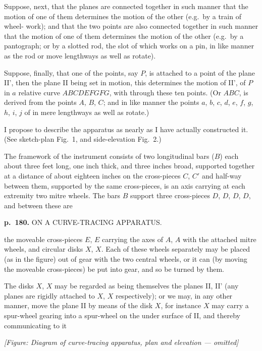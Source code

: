 \documentclass[11pt,a4paper]{book}
\begin{document}
Suppose, next, that the planes are connected together in such manner that the
motion of one of them determines the motion of the other (e.g.\ by a train of wheel-
work); and that the two points are also connected together in such manner that the
motion of one of them determines the motion of the other (e.g.\ by a pantograph; or
by a slotted rod, the slot of which works on a pin, in like manner as the rod or
move lengthways as well as rotate).

Suppose, finally, that one of the points, say $P$, is attached to a point of the
plane II', then the plane II being set in motion, this determines the motion of II',
of $P$ in $a$ relative curve $ABCDEFGFG$, with through these ten points.  (Or $ABC$, is
derived from the points $A$, $B$, $C$; and in like manner the points $a$, $b$, $c$, $d$, $e$, $f$, $g$, $h$, $i$, $j$ of in mere lengthways as well as rotate.)

I propose to describe the apparatus as nearly as I have actually constructed it.
(See sketch-plan Fig.\ 1, and side-elevation Fig.\ 2.)

The framework of the instrument consists of two longitudinal bars ($B$) each about
three feet long, one inch thick, and three inches broad, supported together at a
distance of about eighteen inches on the cross-pieces $C$, $C'$ and half-way between
them, supported by the same cross-pieces, is an axis carrying at each extremity two
mitre wheels.  The bars $B$ support three cross-pieces $D$, $D$, $D$, $D$, and between these are

\clearpage

\noindent
\textbf{p.~180.}  ON A CURVE-TRACING APPARATUS.

the moveable cross-pieces $E$, $E$ carrying the axes of $A$, $A$ with the attached mitre
wheels, and circular disks $X$, $X$. Each of these wheels separately may be placed (as
in the figure) out of gear with the two central wheels, or it can (by moving the
moveable cross-pieces) be put into gear, and so be turned by them.

The disks $X$, $X$ may be regarded as being themselves the planes II, II' (any
planes are rigidly attached to $X$, $X$ respectively); or we may, in any other manner,
move the plane II by means of the disk $X$, for instance $X$ may carry a spur-wheel
gearing into a spur-wheel on the under surface of II, and thereby communicating to it

\begin{center}
\textit{[Figure: Diagram of curve-tracing apparatus, plan and elevation --- omitted]}
\end{center}
\end{document}
